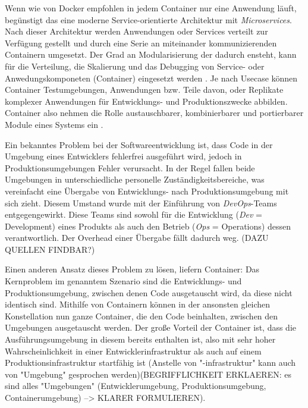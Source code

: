 \documentclass[../main.tex]{subfiles}
\begin{document}

    Wenn wie von Docker empfohlen in jedem Container nur eine Anwendung läuft, begünstigt das eine moderne Service-orientierte Architektur mit \emph{Microservices}. Nach dieser Architektur werden Anwendungen oder Services verteilt zur Verfügung gestellt und durch eine Serie an miteinander kommunizierenden Containern umgesetzt. Der Grad an Modularisierung der dadurch ensteht, kann für die Verteilung, die Skalierung und das Debugging von Service- oder Anwedungskomponeten (Container) eingesetzt werden \cite[S.9]{dockerBook}. Je nach Usecase können Container Testumgebungen, Anwendungen bzw. Teile davon, oder Replikate komplexer Anwendungen für Entwicklungs- und Produktionszwecke abbilden. Container also nehmen die Rolle austauschbarer, kombinierbarer und portierbarer Module eines Systems ein \cite[S.12]{dockerBook}.

    Ein bekanntes Problem bei der Softwareentwicklung ist, dass Code in der Umgebung eines Entwicklers fehlerfrei ausgeführt wird, jedoch in Produktionsumgebungen Fehler verursacht. In der Regel fallen beide Umgebungen in unterschiedliche personelle Zuständigkeitsbereiche, was vereinfacht eine Übergabe von Entwicklungs- nach Produktionsumgebung mit sich zieht. Diesem Umstand wurde mit der Einführung von \emph{DevOps}-Teams entgegengewirkt. Diese Teams sind sowohl für die Entwicklung (\emph{Dev} = Development) eines Produkts als auch den Betrieb (\emph{Ops} = Operations) dessen verantwortlich. Der Overhead einer Übergabe fällt dadurch weg. (DAZU QUELLEN FINDBAR?)

    Einen anderen Ansatz dieses Problem zu lösen, liefern Container: Das Kernproblem im genanntem Szenario sind die Entwicklungs- und Produktionsumgebung, zwischen denen Code ausgetauscht wird, da diese nicht identisch sind. Mithilfe von Containern können in der ansonsten gleichen Konstellation nun ganze Container, die den Code beinhalten, zwischen den Umgebungen ausgetauscht werden. Der große Vorteil der Container ist, dass die Ausführungsumgebung in diesem bereits enthalten ist, also mit sehr hoher Wahrscheinlichkeit in einer Entwicklerinfrastruktur als auch auf einem Produktionsinfrastruktur startfähig ist (Anstelle von "-infrastruktur" kann auch von "Umgebung" gesprochen werden)(BEGRIFFLICHKEIT ERKLAEREN: es sind alles "Umgebungen" (Entwicklerumgebung, Produktionsumgebung, Containerumgebung) --> KLARER FORMULIEREN).
\end{document}

